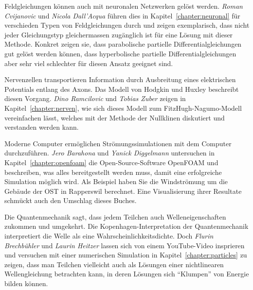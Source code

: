 Feldgleichungen können auch mit neuronalen Netzwerken gelöst werden.
%
\emph{Roman Cvijanovic}
%
%
und
\emph{Nicola Dall'Acqua} 
%
%
führen dies in Kapitel~\ref{chapter:neuronal} für verschieden Typen
von Feldgleichungen durch und zeigen exemplarisch, dass nicht jeder
Gleichungstyp gleichermassen zugänglich ist für eine Lösung mit dieser
Methode. 
Konkret zeigen sie, dass parabolische partielle Differentialgleichungen
gut gelöst werden können, dass hyperbolische partielle Differentialgleichungen
aber sehr viel schlechter für diesen Ansatz geeignet sind.

Nervenzellen transportieren Information durch Ausbreitung eines
%
elektrischen Potentials entlang des Axons.
%
Das Modell von Hodgkin und Huxley beschreibt diesen Vorgang.
%
\emph{Dino Ramcilovic}
%
%
und
\emph{Tobias Zuber}
%
%
zeigen in Kapitel~\ref{chapter:nerven}, wie sich dieses Modell
zum FitzHugh-Nagumo-Modell vereinfachen lässt, welches mit der
%
Methode der Nullklinen diskutiert und verstanden werden kann.
%

Moderne Computer ermöglichen Strömungssimulationen mit dem Computer
%
durchzuführen.
\emph{Jero Barahona}
%
und
\emph{Yanick Diggelmann}
%
%
untersuchen in Kapitel~\ref{chapter:openfoam} die Open-Source-Software
OpenFOAM und beschreiben, was alles bereitgestellt werden muss, damit
%
eine erfolgreiche Simulation möglich wird.
Als Beispiel haben Sie die Windströmung um die Gebäude der OST in
%
%
Rapperswil berechnet.
%
Eine Visualisierung ihrer Resultate schmückt auch den Umschlag dieses
Buches.

Die Quantenmechanik sagt, dass jedem Teilchen auch Welleneigenschaften
%
zukommen und umgekehrt.
Die Kopenhagen-Interpretation der Quantenmechanik interpretiert die
Welle als eine Wahrscheinlichkeitsdichte.
Doch
\emph{Flurin Brechbühler}
%
%
und
\emph{Laurin Heitzer}
%
lassen sich von einem YouTube-Video insprieren und versuchen mit einer
numerischen Simulation in Kapitel~\ref{chapter:particles} zu zeigen,
dass man Teilchen vielleicht auch
als Lösungen einer nichtlinearen Wellengleichung betrachten kann,
in deren Lösungen sich ``Klumpen'' von Energie bilden können.


